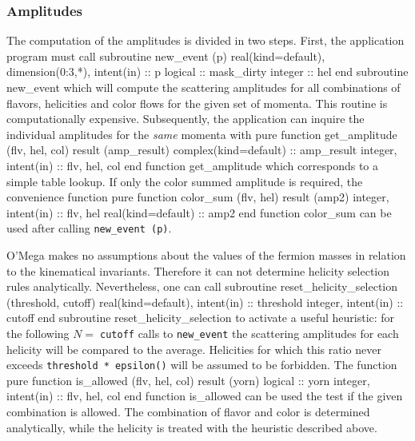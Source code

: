 \documentclass[12pt,a4paper]{article}
\newenvironment{code}{\verbatim}{\endverbatim\noindent}
\begin{document}
\subsubsection{Amplitudes}
The computation of the amplitudes is divided in two steps.  First, the
application program must call
\begin{code}
  subroutine new_event (p)
    real(kind=default), dimension(0:3,*), intent(in) :: p
    logical :: mask_dirty
    integer :: hel
  end subroutine new_event
\end{code}
which will compute the scattering amplitudes for all combinations of
flavors, helicities and color flows for the given set of momenta.
This routine is computationally expensive.  Subsequently, the
application can inquire the individual amplitudes for the \emph{same}
momenta with
\begin{code}
  pure function get_amplitude (flv, hel, col) result (amp_result)
    complex(kind=default) :: amp_result
    integer, intent(in) :: flv, hel, col
  end function get_amplitude
\end{code}
which corresponds to a simple table lookup.  If only the color summed
amplitude is required, the convenience function
\begin{code}
  pure function color_sum (flv, hel) result (amp2)
    integer, intent(in) :: flv, hel
    real(kind=default) :: amp2
  end function color_sum
\end{code}
can be used after calling \verb+new_event (p)+.

O'Mega makes no assumptions about the values of the fermion masses in
relation to the kinematical invariants.  Therefore it can not
determine helicity selection rules analytically.  Nevertheless, one
can call
\begin{code}
  subroutine reset_helicity_selection (threshold, cutoff)
    real(kind=default), intent(in) :: threshold
    integer, intent(in) :: cutoff
  end subroutine reset_helicity_selection
\end{code}
to activate a useful heuristic: for the following $N = \;$\verb+cutoff+ calls
to \verb+new_event+ the scattering amplitudes for each helicity will
be compared to the average.  Helicities for which this ratio never
exceeds \verb+threshold * epsilon()+ will be assumed to be forbidden.
The function
\begin{code}
  pure function is_allowed (flv, hel, col) result (yorn)
    logical :: yorn
    integer, intent(in) :: flv, hel, col
  end function is_allowed
\end{code}
can be used the test if the given combination is allowed.  The
combination of flavor and color is determined analytically, while the
helicity is treated with the heuristic described above.
\end{document}

